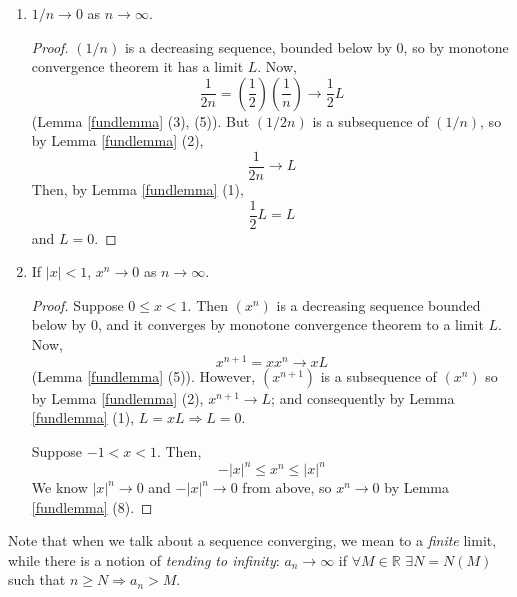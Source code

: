 \documentclass[10pt, a4paper, twoside]{report}
\begin{document}
\begin{lemma}\item[]
    \begin{enumerate}
        \item \(1/n\to 0\) as \(n\to\infty\).
        \begin{proof}
            \((1/n)\) is a decreasing sequence, bounded below by 0, so by monotone convergence theorem it has a limit \(L\). Now,
            \[\frac{1}{2n}=\left(\frac 12\right)\left(\frac 1n\right)\to\frac 12 L\]
            (Lemma \ref{fundlemma} (3), (5)). But \((1/2n)\) is a subsequence of \((1/n)\), so by Lemma \ref{fundlemma} (2),
            \[\frac 1{2n}\to L\]
            Then, by Lemma \ref{fundlemma} (1),
            \[\frac{1}{2}L=L\]
            and \(L=0\).
        \end{proof}
        \item If \(|x|<1\), \(x^n\to 0\) as \(n\to\infty\).
        \begin{proof}
            Suppose \(0\leq x<1\). Then \((x^n)\) is a decreasing sequence bounded below by \(0\), and it converges by monotone convergence theorem to a limit \(L\). Now,
            \[x^{n+1}=xx^n\to xL\]
            (Lemma \ref{fundlemma} (5)). However, \((x^{n+1})\) is a subsequence of \((x^n)\) so by Lemma \ref{fundlemma} (2), \(x^{n+1}\to L\); and consequently by Lemma \ref{fundlemma} (1), \(L=xL\Rightarrow L=0\).

            Suppose \(-1<x<1\). Then,
            \[-|x|^n\leq x^n\leq|x|^n\]
            We know \(|x|^n\to 0\) and \(-|x|^n\to 0\) from above, so
            \(x^n\to 0\) by Lemma \ref{fundlemma} (8).
        \end{proof}
    \end{enumerate}
\end{lemma}
Note that when we talk about a sequence converging, we mean to a \emph{finite} limit, while there is a notion of \emph{tending to infinity}: \(a_n\to\infty\) if \(\forall M\in\mathbb{R}\) \(\exists N=N(M)\) such that \(n\geq N\Rightarrow a_n>M\). 
\end{document}
